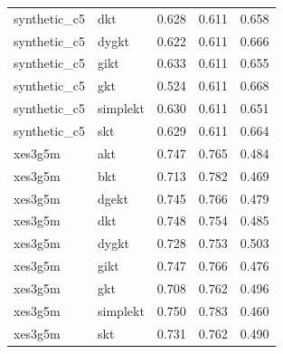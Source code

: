 \begin{table}[t]
\begin{tabular}{llrrr}
synthetic_c5 & dkt & 0.628 & 0.611 & 0.658 \\
synthetic_c5 & dygkt & 0.622 & 0.611 & 0.666 \\
synthetic_c5 & gikt & 0.633 & 0.611 & 0.655 \\
synthetic_c5 & gkt & 0.524 & 0.611 & 0.668 \\
synthetic_c5 & simplekt & 0.630 & 0.611 & 0.651 \\
synthetic_c5 & skt & 0.629 & 0.611 & 0.664 \\
xes3g5m & akt & 0.747 & 0.765 & 0.484 \\
xes3g5m & bkt & 0.713 & 0.782 & 0.469 \\
xes3g5m & dgekt & 0.745 & 0.766 & 0.479 \\
xes3g5m & dkt & 0.748 & 0.754 & 0.485 \\
xes3g5m & dygkt & 0.728 & 0.753 & 0.503 \\
xes3g5m & gikt & 0.747 & 0.766 & 0.476 \\
xes3g5m & gkt & 0.708 & 0.762 & 0.496 \\
xes3g5m & simplekt & 0.750 & 0.783 & 0.460 \\
xes3g5m & skt & 0.731 & 0.762 & 0.490 \\
\bottomrule
\end{tabular}
\end{table}

